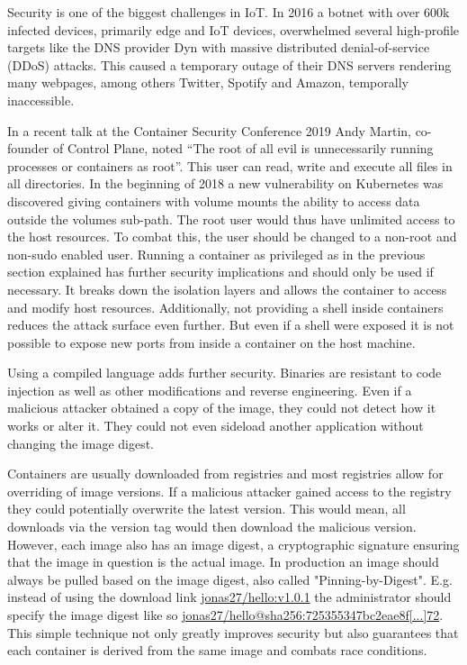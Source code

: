Security is one of the biggest challenges in IoT. In 2016 a botnet with over 600k infected devices, primarily edge and IoT devices, overwhelmed several high-profile targets like the DNS provider Dyn with massive distributed denial-of-service (DDoS) attacks. This caused a temporary outage of their DNS servers rendering many webpages, among others  Twitter, Spotify and Amazon, temporally inaccessible.

In a recent talk at the Container Security Conference 2019 Andy Martin, co-founder of Control Plane, noted ``The root of all evil is unnecessarily running processes or containers as root''\cite{RootlessContainerSecurityTalk0:online}. This user can read, write and execute all files in all directories. In the beginning of 2018 a new vulnerability on Kubernetes was discovered giving containers with volume mounts the ability to access data outside the volumes sub-path. The root user would thus have unlimited access to the host resources. To combat this, the user should be changed to a non-root and non-sudo enabled user. Running a container as privileged as in the previous section explained has further security implications and should only be used if necessary. It breaks down the isolation layers and allows the container to access and modify host resources. Additionally, not providing a shell inside containers reduces the attack surface even further. But even if a shell were exposed it is not possible to expose new ports from inside a container on the host machine.

Using a compiled language adds further security. Binaries are resistant to code injection as well as other modifications and reverse engineering. Even if a malicious attacker obtained a copy of the image, they could not detect how it works or alter it. They could not even sideload another application without changing the image digest.

Containers are usually downloaded from registries and most registries allow for overriding of image versions. If a malicious attacker gained access to the registry they could potentially overwrite the latest version. This would mean, all downloads via the version tag would then download the malicious version. However, each image also has an image digest, a cryptographic signature ensuring that the image in question is the actual image. In production an image should always be pulled based on the image digest, also called "Pinning-by-Digest". E.g. instead of using the download link \url{jonas27/hello:v1.0.1} the administrator should specify the image digest like so \url{jonas27/hello@sha256:725355347bc2eae8f[...]72}. This simple technique not only greatly improves security but also guarantees that each container is derived from the same image and combats race conditions.


